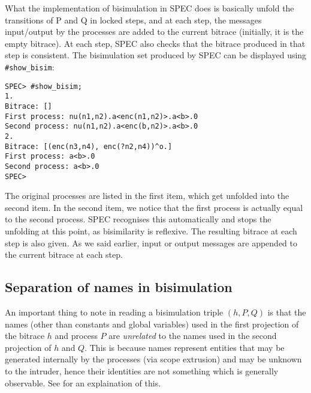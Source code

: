\documentclass{article}
\begin{document}
What the implementation of bisimulation in SPEC does is basically
unfold the transitions of P and Q in locked steps, and at each step, the 
messages input/output by the processes are added to the current bitrace (initially,
it is the empty bitrace). At each step, SPEC also checks that the bitrace produced
in that step is consistent. 
The bisimulation set produced by SPEC can be displayed using \texttt{\#show\_bisim}:
\begin{verbatim}
SPEC> #show_bisim;
1. 
Bitrace: []
First process: nu(n1,n2).a<enc(n1,n2)>.a<b>.0
Second process: nu(n1,n2).a<enc(b,n2)>.a<b>.0
2. 
Bitrace: [(enc(n3,n4), enc(?n2,n4))^o.]
First process: a<b>.0
Second process: a<b>.0
SPEC>
\end{verbatim}
The original processes are listed in the first item, which get unfolded into the second
item. In the second item, we notice that the first process is actually equal to the second
process. SPEC recognises this automatically and stops the unfolding at this point, as 
bisimilarity is reflexive. 
The resulting bitrace at each step is also given.
As we said earlier, input or output messages are appended to the current bitrace at each
step. 

\subsection{Separation of names in bisimulation}

An important thing to note in reading a bisimulation triple $(h,P,Q)$ is that
the names (other than constants and global variables) used in the first projection of the bitrace $h$
and process $P$ are {\em unrelated} to the names used in the second projection of $h$
and $Q$. This is because names represent entities that may be generated internally
by the processes (via scope extrusion) and may be unknown to the intruder, hence their
identities are not something which is generally observable. 
See \cite{abadi98njc} for an explaination of this. 
\end{document}
